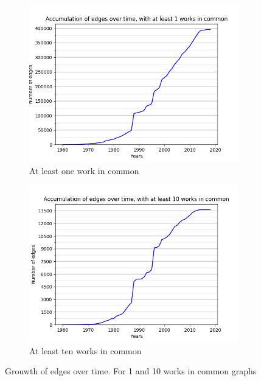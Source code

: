 \begin{figure}
	\centering
	\begin{subfigure}{.5\columnwidth}
		\centering
		\includegraphics[scale=0.39]{graphics/accumulationEdges_1_1960-2018.png}
		\caption{At least one work in common}
		\label{fig:edgesOneWorkInCommon}
	\end{subfigure}%
	\begin{subfigure}{.5\columnwidth}
		\centering
		\includegraphics[scale=0.39]{graphics/accumulationEdges_10_1960-2018.png}
		\caption{At least ten works in common}
		\label{fig:edgesTenWorskInCommon}
	\end{subfigure}
	\caption{Grouwth of edges over time. For 1 and 10 works in common graphs}
	\label{fig:grouwthOfEdges}
\end{figure}

